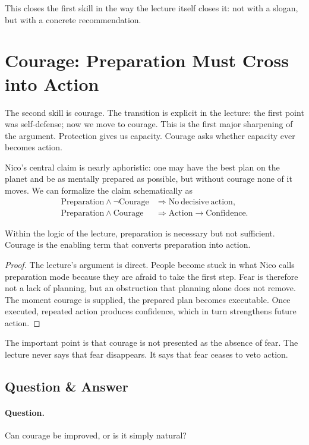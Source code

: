 This closes the first skill in the way the lecture itself closes it: not with a slogan, but with a concrete recommendation.

\section{Courage: Preparation Must Cross into Action}

The second skill is courage. The transition is explicit in the lecture: the first point was self-defense; now we move to courage. This is the first major sharpening of the argument. Protection gives us capacity. Courage asks whether capacity ever becomes action.

Nico's central claim is nearly aphoristic: one may have the best plan on the planet and be as mentally prepared as possible, but without courage none of it moves. We can formalize the claim schematically as
\begin{align}
\mathrm{Preparation}\land \neg \mathrm{Courage} &\Rightarrow \mathrm{No\ decisive\ action},\\
\mathrm{Preparation}\land \mathrm{Courage} &\Rightarrow \mathrm{Action}\to \mathrm{Confidence}.
\end{align}

\begin{proposition}
Within the logic of the lecture, preparation is necessary but not sufficient. Courage is the enabling term that converts preparation into action.
\end{proposition}

\begin{proof}
The lecture's argument is direct. People become stuck in what Nico calls preparation mode because they are afraid to take the first step. Fear is therefore not a lack of planning, but an obstruction that planning alone does not remove. The moment courage is supplied, the prepared plan becomes executable. Once executed, repeated action produces confidence, which in turn strengthens future action.
\end{proof}

The important point is that courage is not presented as the absence of fear. The lecture never says that fear disappears. It says that fear ceases to veto action.

\subsection{Question \& Answer}

\paragraph{Question.} Can courage be improved, or is it simply natural?

